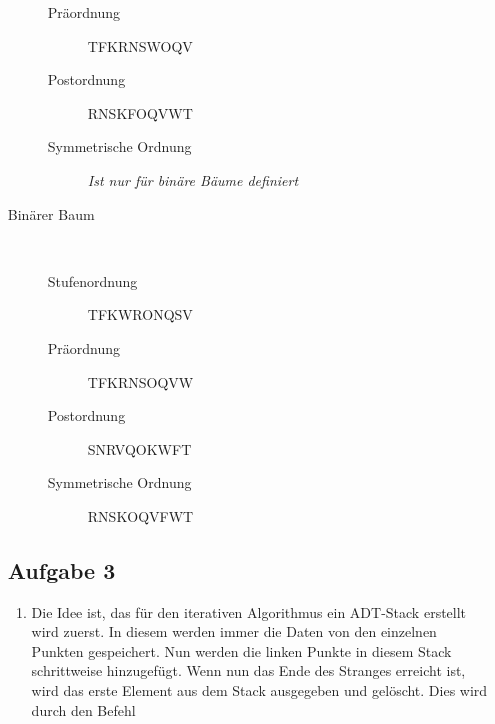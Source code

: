 \documentclass[11pt]{article}
\begin{document}
\begin{enumerate}[a)]
\begin{description}
\begin{description}
          \item[Präordnung]
            TFKRNSWOQV

          \item[Postordnung]
            RNSKFOQVWT

          \item[Symmetrische Ordnung]
            \emph{Ist nur für binäre Bäume definiert}

        \end{description}

      \item[Binärer Baum] $ $
        \begin{description}

          \item[Stufenordnung] 
            TFKWRONQSV

          \item[Präordnung]
            TFKRNSOQVW

          \item[Postordnung]
            SNRVQOKWFT

          \item[Symmetrische Ordnung]
            RNSKOQVFWT

        \end{description}
    \end{description}
    \subsection*{Aufgabe 3}
    \begin{enumerate}[a]
    	
      \item
      Die Idee ist, das für den iterativen Algorithmus ein ADT-Stack erstellt
      wird zuerst. In diesem werden immer die Daten von den einzelnen Punkten
      gespeichert. Nun werden die linken Punkte in diesem Stack schrittweise 
      hinzugefügt. Wenn nun das Ende des Stranges erreicht ist, wird das 
      erste Element aus dem Stack ausgegeben und gelöscht. Dies wird durch den Befehl
      
      
       
          
    \end{enumerate}
     
        
\end{enumerate} 
\end{document}
